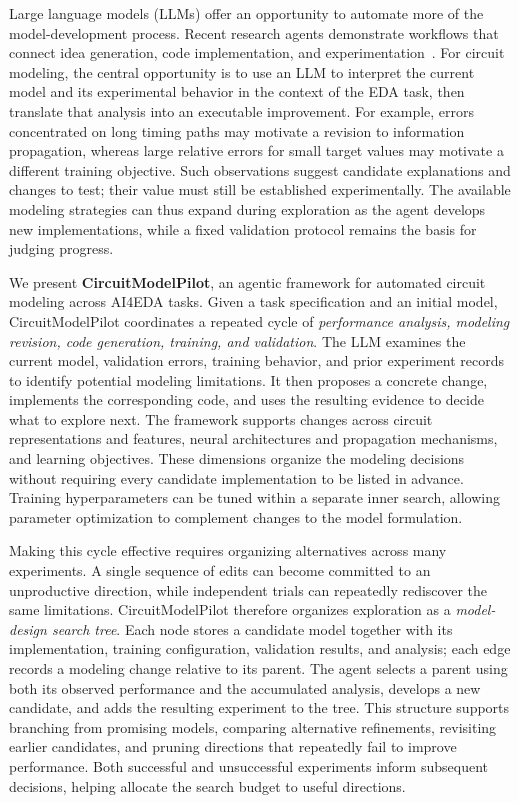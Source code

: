 Large language models (LLMs) offer an opportunity to automate more of the model-development process. Recent research agents demonstrate workflows that connect idea generation, code implementation, and experimentation~\cite{lu2024aiscientist}. For circuit modeling, the central opportunity is to use an LLM to interpret the current model and its experimental behavior in the context of the EDA task, then translate that analysis into an executable improvement. For example, errors concentrated on long timing paths may motivate a revision to information propagation, whereas large relative errors for small target values may motivate a different training objective. Such observations suggest candidate explanations and changes to test; their value must still be established experimentally. The available modeling strategies can thus expand during exploration as the agent develops new implementations, while a fixed validation protocol remains the basis for judging progress.

We present \textbf{CircuitModelPilot}, an agentic framework for automated circuit modeling across AI4EDA tasks. Given a task specification and an initial model, CircuitModelPilot coordinates a repeated cycle of \emph{performance analysis, modeling revision, code generation, training, and validation}. The LLM examines the current model, validation errors, training behavior, and prior experiment records to identify potential modeling limitations. It then proposes a concrete change, implements the corresponding code, and uses the resulting evidence to decide what to explore next. The framework supports changes across circuit representations and features, neural architectures and propagation mechanisms, and learning objectives. These dimensions organize the modeling decisions without requiring every candidate implementation to be listed in advance. Training hyperparameters can be tuned within a separate inner search, allowing parameter optimization to complement changes to the model formulation.

Making this cycle effective requires organizing alternatives across many experiments. A single sequence of edits can become committed to an unproductive direction, while independent trials can repeatedly rediscover the same limitations. CircuitModelPilot therefore organizes exploration as a \textit{model-design search tree}. Each node stores a candidate model together with its implementation, training configuration, validation results, and analysis; each edge records a modeling change relative to its parent. The agent selects a parent using both its observed performance and the accumulated analysis, develops a new candidate, and adds the resulting experiment to the tree. This structure supports branching from promising models, comparing alternative refinements, revisiting earlier candidates, and pruning directions that repeatedly fail to improve performance. Both successful and unsuccessful experiments inform subsequent decisions, helping allocate the search budget to useful directions.

